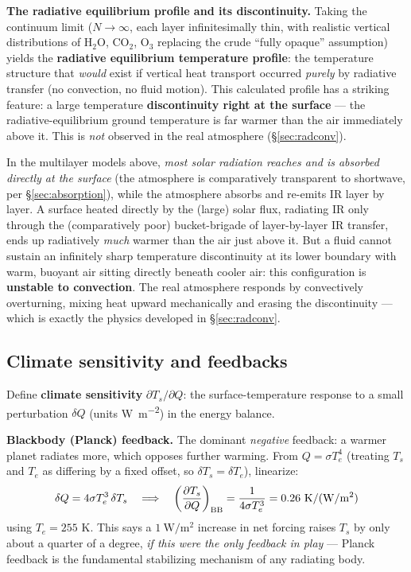 \documentclass[11pt]{article}
\begin{document}
\textbf{The radiative equilibrium profile and its discontinuity.} Taking the continuum limit ($N\to\infty$, each layer infinitesimally thin, with realistic vertical distributions of H$_2$O, CO$_2$, O$_3$ replacing the crude ``fully opaque'' assumption) yields the \textbf{radiative equilibrium temperature profile}: the temperature structure that \emph{would} exist if vertical heat transport occurred \emph{purely} by radiative transfer (no convection, no fluid motion). This calculated profile has a striking feature: a large temperature \textbf{discontinuity right at the surface} — the radiative-equilibrium ground temperature is far warmer than the air immediately above it. This is \emph{not} observed in the real atmosphere (\S\ref{sec:radconv}).

\begin{intuition}
In the multilayer models above, \emph{most solar radiation reaches and is absorbed directly at the surface} (the atmosphere is comparatively transparent to shortwave, per \S\ref{sec:absorption}), while the atmosphere absorbs and re-emits IR layer by layer. A surface heated directly by the (large) solar flux, radiating IR only through the (comparatively poor) bucket-brigade of layer-by-layer IR transfer, ends up radiatively \emph{much} warmer than the air just above it. But a fluid cannot sustain an infinitely sharp temperature discontinuity at its lower boundary with warm, buoyant air sitting directly beneath cooler air: this configuration is \textbf{unstable to convection}. The real atmosphere responds by convectively overturning, mixing heat upward mechanically and erasing the discontinuity — which is exactly the physics developed in \S\ref{sec:radconv}.
\end{intuition}

\subsection{Climate sensitivity and feedbacks}
\label{sec:feedback}

Define \textbf{climate sensitivity} $\partial T_s/\partial Q$: the surface-temperature response to a small perturbation $\delta Q$ (units \si{\watt\per\square\m}) in the energy balance.

\textbf{Blackbody (Planck) feedback.} The dominant \emph{negative} feedback: a warmer planet radiates more, which opposes further warming. From $Q=\sigma T_e^4$ (treating $T_s$ and $T_e$ as differing by a fixed offset, so $\delta T_s = \delta T_e$), linearize:
\begin{equation}
\delta Q = 4\sigma T_e^3\,\delta T_s \quad\Longrightarrow\quad \left(\frac{\partial T_s}{\partial Q}\right)_{\rm BB} = \frac{1}{4\sigma T_e^3} = 0.26\ \si{\kelvin\per(\watt\per\square\m)}
\label{eq:BBfeedback}
\end{equation}
using $T_e=255$ K. This says a $1\ \si{\watt\per\square\m}$ increase in net forcing raises $T_s$ by only about a quarter of a degree, \emph{if this were the only feedback in play} — Planck feedback is the fundamental stabilizing mechanism of any radiating body.
\end{document}
